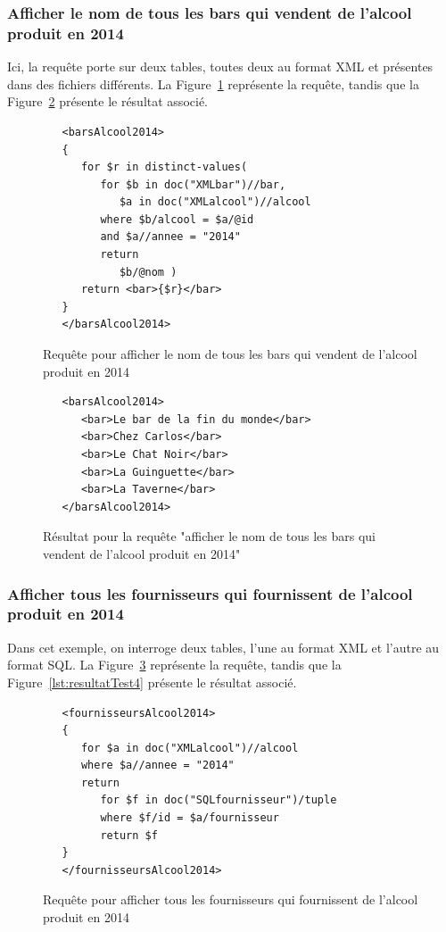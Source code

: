 \documentclass[a4paper,10pt]{article}
\newcommand{\fref}[1]{Figure~\ref{#1}}
\begin{document}
\FloatBarrier
\subsubsection{Afficher le nom de tous les bars qui vendent de l'alcool produit en 2014}

Ici, la requête porte sur deux tables, toutes deux au format XML et présentes dans des fichiers différents. La \fref{lst:requeteTest3} représente la requête, tandis que la \fref{lst:resultatTest3} présente le résultat associé.

\begin{figure}[ht!]
\begin{verbatim}
   <barsAlcool2014>
   {
      for $r in distinct-values(
         for $b in doc("XMLbar")//bar,
            $a in doc("XMLalcool")//alcool
         where $b/alcool = $a/@id
         and $a//annee = "2014"
         return 
            $b/@nom )
      return <bar>{$r}</bar>
   }
   </barsAlcool2014>
\end{verbatim}
\caption{Requête pour afficher le nom de tous les bars qui vendent de l'alcool produit en 2014}
\label{lst:requeteTest3}
\end{figure}

\begin{figure}[ht!]
\begin{verbatim}
   <barsAlcool2014>
      <bar>Le bar de la fin du monde</bar>
      <bar>Chez Carlos</bar>
      <bar>Le Chat Noir</bar>
      <bar>La Guinguette</bar>
      <bar>La Taverne</bar>
   </barsAlcool2014>
\end{verbatim}
\caption{Résultat pour la requête "afficher le nom de tous les bars qui vendent de l'alcool produit en 2014"}
\label{lst:resultatTest3}
\end{figure}


\FloatBarrier
\subsubsection{Afficher tous les fournisseurs qui fournissent de l'alcool produit en 2014}

Dans cet exemple, on interroge deux tables, l'une au format XML et l'autre au format SQL. La \fref{lst:requeteTest4} représente la requête, tandis que la \fref{lst:resultatTest4} présente le résultat associé.

\begin{figure}[ht!]
\begin{verbatim}
   <fournisseursAlcool2014>
   {
      for $a in doc("XMLalcool")//alcool
      where $a//annee = "2014"
      return
         for $f in doc("SQLfournisseur")/tuple
         where $f/id = $a/fournisseur
         return $f	
   }
   </fournisseursAlcool2014>
\end{verbatim}
\caption{Requête pour afficher tous les fournisseurs qui fournissent de l'alcool produit en 2014}
\label{lst:requeteTest4}
\end{figure}
\end{document}
